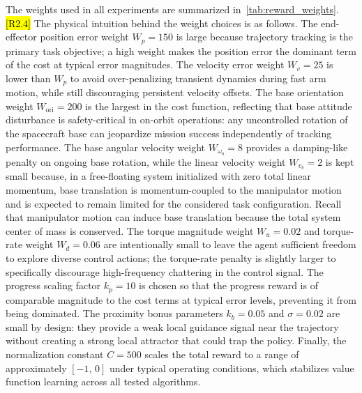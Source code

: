 \documentclass{ieeeaccess}
\newcommand{\hltwo}[1]{{\sethlcolor{rtwo}\hl{#1}}}
\newenvironment{rtwohl}
  {\def\FrameCommand{\colorbox{rtwo}}\MakeFramed{\advance\hsize-\width\FrameRestore}}
  {\endMakeFramed}
\begin{document}
The weights used in all experiments are summarized in~\autoref{tab:reward_weights}.
\begin{rtwohl}
\hltwo{[R2.4]} The physical intuition behind the weight choices is as follows.
The end-effector position error weight $W_p = 150$ is large because trajectory tracking is the primary task objective; a high weight makes the position error the dominant term of the cost at typical error magnitudes.
The velocity error weight $W_v = 25$ is lower than $W_p$ to avoid over-penalizing transient dynamics during fast arm motion, while still discouraging persistent velocity offsets.
The base orientation weight $W_{\text{ori}} = 200$ is the largest in the cost function, reflecting that base attitude disturbance is safety-critical in on-orbit operations: any uncontrolled rotation of the spacecraft base can jeopardize mission success independently of tracking performance.
The base angular velocity weight $W_{\omega_b} = 8$ provides a damping-like penalty on ongoing base rotation, while the linear velocity weight $W_{v_b} = 2$ is kept small because, in a free-floating system initialized with zero total linear momentum, base translation is momentum-coupled to the manipulator motion and is expected to remain limited for the considered task configuration. Recall that manipulator motion can induce base translation because the total system center of mass is conserved. The torque magnitude weight $W_u = 0.02$ and torque-rate weight $W_d = 0.06$ are intentionally small to leave the agent sufficient freedom to explore diverse control actions; the torque-rate penalty is slightly larger to specifically discourage high-frequency chattering in the control signal.
The progress scaling factor $k_p = 10$ is chosen so that the progress reward is of comparable magnitude to the cost terms at typical error levels, preventing it from being dominated.
The proximity bonus parameters $k_b = 0.05$ and $\sigma = 0.02$ are small by design: they provide a weak local guidance signal near the trajectory without creating a strong local attractor that could trap the policy.
Finally, the normalization constant $C = 500$ scales the total reward to a range of approximately $[-1,\, 0]$ under typical operating conditions, which stabilizes value function learning across all tested algorithms.
\end{rtwohl}
\end{document}
